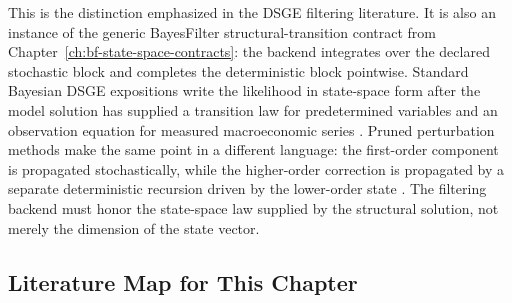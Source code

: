 This is the distinction emphasized in the DSGE filtering literature.  It is
also an instance of the generic BayesFilter structural-transition contract from
Chapter~\ref{ch:bf-state-space-contracts}: the backend integrates over the
declared stochastic block and completes the deterministic block pointwise.
Standard Bayesian DSGE expositions write the likelihood in state-space form
after the model solution has supplied a transition law for predetermined
variables and an observation equation for measured macroeconomic series
\citep{herbst2015bayesian,an2007bayesian}.  Pruned perturbation methods make
the same point in a different language: the first-order component is propagated
stochastically, while the higher-order correction is propagated by a separate
deterministic recursion driven by the lower-order state
\citep{kim2008calculating,andreasen2018pruned}.  The filtering backend must
honor the state-space law supplied by the structural solution, not merely the
dimension of the state vector.

\subsection{Literature Map for This Chapter}
\label{sec:bf-structural-literature-map}

